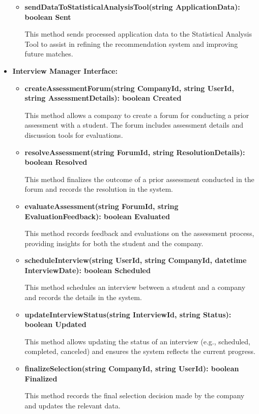 \begin{itemize}
\begin{itemize}
    \item \textbf{sendDataToStatisticalAnalysisTool(string ApplicationData): boolean Sent}

    This method sends processed application data to the Statistical Analysis Tool to assist in refining the recommendation system and improving future matches.
    \end{itemize}

\item \textbf{Interview Manager Interface:}
\begin{itemize}
    \item \textbf{createAssessmentForum(string CompanyId, string UserId, string AssessmentDetails): boolean Created}

    This method allows a company to create a forum for conducting a prior assessment with a student. The forum includes assessment details and discussion tools for evaluations.

    \item \textbf{resolveAssessment(string ForumId, string ResolutionDetails): boolean Resolved}

    This method finalizes the outcome of a prior assessment conducted in the forum and records the resolution in the system.

    \item \textbf{evaluateAssessment(string ForumId, string EvaluationFeedback): boolean Evaluated}

    This method records feedback and evaluations on the assessment process, providing insights for both the student and the company.
    
    \item \textbf{scheduleInterview(string UserId, string CompanyId, datetime InterviewDate): boolean Scheduled}

    This method schedules an interview between a student and a company and records the details in the system.

    \item \textbf{updateInterviewStatus(string InterviewId, string Status): boolean Updated}

    This method allows updating the status of an interview (e.g., scheduled, completed, canceled) and ensures the system reflects the current progress.

    \item \textbf{finalizeSelection(string CompanyId, string UserId): boolean Finalized}

    This method records the final selection decision made by the company and updates the relevant data.


\end{itemize}
\end{itemize}
